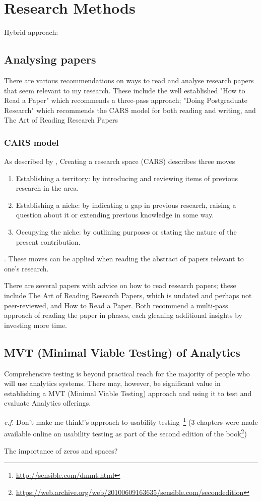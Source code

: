 \chapter{Research Methods}

Hybrid approach: 

\section{Analysing papers}
There are various recommendations on ways to read and analyse research papers that seem relevant to my research. These include the well established "How to Read a Paper"\cite{keshav2007read} which recommends a three-pass approach; "Doing Postgraduate Research"\cite{potter2006doing} which recommends the CARS model for both reading and writing, and The Art of Reading Research Papers

\subsection{CARS model}
As described by \cite{potter2006doing}, Creating a research space (CARS) describes three moves
\begin{enumerate}
    \item Establishing a territory: by introducing and reviewing items of previous research in the area.
    \item Establishing a niche: by indicating a gap in previous research, raising a question about it or extending previous knowledge in some way.
    \item Occupying the niche: by outlining purposes or stating the nature of the present contribution.
\end{enumerate}.
These moves can be applied when reading the abstract of papers relevant to one's research.

There are several papers with advice on how to read research papers; these include The Art of Reading Research Papers\cite{madooei_art_of_reading_research_papers}, which is undated and perhaps not peer-reviewed, and How to Read a Paper\cite{keshav2007read}. Both recommend a multi-pass approach of reading the paper in phases, each gleaning additional insights by investing more time.

\section{MVT (Minimal Viable Testing) of Analytics}
Comprehensive testing is beyond practical reach for the majority of people who will use analytics systems. There may, however, be significant value in establishing a MVT (Minimal Viable Testing) approach and using it to test and evaluate Analytics offerings. 

\emph{c.f.} Don't make me think!'s approach to usability testing~\cite{krug2000dont_make_me_think}\footnote{\url{http://sensible.com/dmmt.html}} (3 chapters were made available online on usability testing as part of the second edition of the book\footnote{\url{https://web.archive.org/web/20100609163635/sensible.com/secondedition}}) 

The importance of zeros and spaces? 